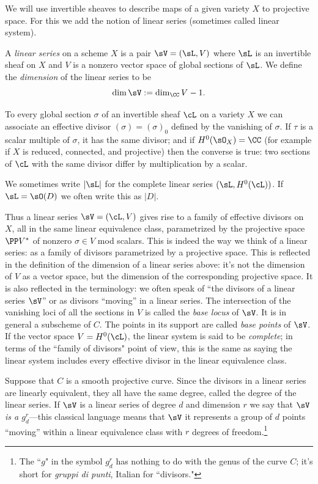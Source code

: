 We will use invertible sheaves to  describe maps of a given variety $X$ to projective space. For this we add the notion of linear series (sometimes called linear system). 

\begin{definition}
 A \emph{linear series} on a scheme $X$ is a pair $\sV  = (\sL, V)$ where $\sL$ is an invertible sheaf  on $X$ and
 $V$ is a nonzero vector space of global sections of $\sL$. We define the \emph{dimension} of the linear series to be 
 $$
 \dim \sV := \dim_\CC V -1.
 $$
  \end{definition}
  
To every global section $\sigma$ of an invertible sheaf $\cL$ on a variety $X$  we can associate an effective divisor $(\sigma) = (\sigma)_0$ defined by the vanishing of $\sigma$. If $\tau$ is a scalar multiple of $\sigma$, it has the same divisor; and if 
 $H^0(\sO_X) = \CC$ (for example if $X$ is reduced, connected, and
 projective) then the converse is true: two sections of $\cL$ with the same divisor differ by multiplication by a scalar.  
 
 We sometimes write
 $|\sL|$ for the complete linear series $(\sL, H^0(\cL))$. If $\sL = \sO(D)$ we often write this as $|D|$.

Thus a linear series $\sV = (\cL, V)$ gives rise to a family of effective divisors on $X$, all in the same linear equivalence class, parametrized by the projective space $\PP V^*$ of nonzero $\sigma \in V$ mod scalars. This is indeed the way 
we think of a linear series: as a family of divisors parametrized by a projective space. This is reflected in the definition of the dimension of a linear series above: it's not the dimension of $V$ as a vector space, but the dimension of the corresponding projective space. It is also reflected in the terminology: we often speak of ``the divisors of a linear series $\sV$'' or as divisors ``moving'' in a linear series. The intersection of the vanishing loci of all the sections in $V$ is called the \emph{base locus} of $\sV$. It is in general a subscheme of $C$. The points in its support are called \emph{base points} of $\sV$.  If the vector space $V = H^0(\cL)$, the linear system is said to be \emph{complete}; in terms of the ``family of divisors" point of view, this is the same as saying the linear system includes every effective divisor in the linear equivalence class.
 
Suppose that $C$ is a smooth projective curve. Since the divisors in a linear series are linearly equivalent, they all have the same 
degree, called the degree of the linear series. If $\sV$ is a linear series of degree $d$ and dimension $r$ we say that \emph{$\sV$ is a $g^r_d$}---this classical  language means that $\sV$ it represents a group of $d$ points ``moving'' within a linear equivalence class with $r$ degrees of freedom.\footnote{The ``$g$" in the symbol $g^r_d$ has nothing to do with the genus of the curve $C$; it's short for \emph{gruppi di punti}, Italian for ``divisors."}

